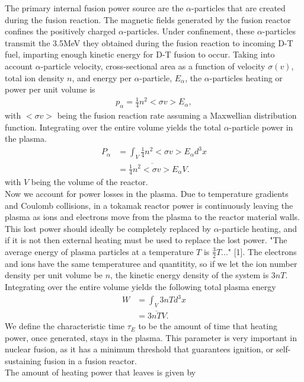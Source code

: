 \documentclass{article}
\begin{document}
The primary internal fusion power source are the $\alpha$-particles that are created during the fusion reaction. The magnetic fields generated by the fusion reactor confines the positively charged $\alpha$-particles. Under confinement, these $\alpha$-particles transmit the 3.5MeV they obtained during the fusion reaction to incoming D-T fuel, imparting enough kinetic energy for D-T fusion to occur. Taking into account $\alpha$-particle velocity, cross-sectional area as a function of velocity $\sigma(v)$, total ion density $n$, and energy per $\alpha$-particle, $E_{\alpha}$, the $\alpha$-particles heating or power per unit volume is
\begin{align*}
p_{\alpha} = \frac{1}{4} n^2 <\sigma v> E_{\alpha},
\end{align*}
with $<\sigma v>$ being the fusion reaction rate assuming a Maxwellian distribution function. 
Integrating over the entire volume yields the total $\alpha$-particle power in the plasma.
\begin{align*}
P_\alpha &= \int_V \frac{1}{4} n^2 <\sigma v> E_{\alpha} d^3x\\
	     &=  \frac{1}{4}\overline{n^2<\sigma v>}E_{\alpha}V.
\end{align*}
 with $V$ being the volume of the reactor.\\
Now we account for power losses in the plasma. Due to temperature gradients and Coulomb collisions, in a tokamak reactor power is continuously leaving the plasma as ions and electrons move from the plasma to the reactor material walls. This lost power should ideally be completely replaced by $\alpha$-particle heating, and if it is not then external heating must be used to replace the lost power. "The average energy of plasma particles at a temperature $T$ is $\frac{3}{2} T$..." [1]. The electrons and ions have the same temperaturee and quantitity, so if we let the ion number density per unit volume be $n$, the kinetic energy density of the  system is $3nT$. Integrating over the entire volume yields the following total plasma energy 
\begin{align*}
W &= \int_{V}3nTd^3x\\
    &=3\overline{nT}V.
\end{align*}
We define the characteristic time $\tau_E$ to be the amount of time that heating power, once generated, stays in the plasma. This parameter is very important in nuclear fusion, as it has a minimum threshold that guarantees ignition, or self-sustaining fusion in a fusion reactor.\\ The amount of heating power that leaves is given by 
\end{document}
